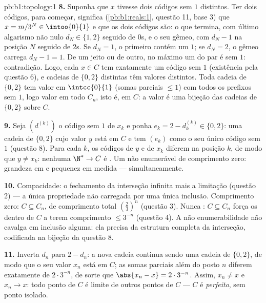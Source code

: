 \begin{solution}{pb:b1:topology:1}
\textbf{8.} Suponha que $x$ tivesse dois códigos sem $1$ distintos. Ter
dois códigos, para começar, significa (\cref{pb:b1:reals:1}, questão 11, base
$3$) que $x = m/3^N \in \intoo{0}{1}$ e que os dois códigos são:
o que termina, com último algarismo não nulo $d_N \in \{1, 2\}$
seguido de $0$s, e o seu gêmeo, com $d_N - 1$ na posição $N$
seguido de $2$s. Se $d_N = 1$, o primeiro contém um $1$; se $d_N
= 2$, o gêmeo carrega $d_N - 1 = 1$. De um jeito ou de outro, no máximo um
do par é sem $1$: contradição. Logo, cada $x \in C$ tem
exatamente um código sem $1$ (existência pela questão 6), e
cadeias de $\{0,2\}$ distintas têm valores distintos. Toda
cadeia de $\{0,2\}$ tem valor em $\intcc{0}{1}$ (somas parciais $\leq
1$) com todos os prefixos sem $1$, logo valor em todo $C_n$,
isto é, em $C$: a  valor é uma bijeção das
cadeias de $\{0,2\}$ sobre $C$.

\textbf{9.} Seja $(d^{(k)})$ o código sem $1$ de $x_k$ e
ponha $e_k = 2 - d^{(k)}_k \in \{0, 2\}$: uma cadeia de $\{0,2\}$ cujo
valor $y$ está em $C$ e tem $(e_k)$ como o seu único código
sem $1$ (questão 8). Para cada $k$, os códigos de $y$ e de $x_k$
diferem na posição $k$, de modo que $y \neq x_k$: nenhuma  $\N^* \to C$ é
. Um  não enumerável de comprimento zero: grandeza
em  e pequenez em medida --- simultaneamente.

\textbf{10.} Compacidade: o fechamento da interseção infinita
mais a limitação (questão 2) --- a única propriedade
não carregada por uma única inclusão. Comprimento zero: $C \subseteq
C_n$, de comprimento total $(\frac23)^n$ (questão 3). Nunca
: $C \subseteq C_n$ força os  dentro de $C$ a terem
comprimento $\leq 3^{-n}$ (questão 4). A não enumerabilidade não
cavalga em inclusão alguma: ela precisa da estrutura completa da
interseção, codificada na bijeção da questão 8.

\textbf{11.} Inverta $d_n$ para $2 - d_n$: a nova cadeia continua sendo
uma cadeia de $\{0,2\}$, de modo que o seu valor $x_n$ está em $C$; as
somas parciais além do posto $n$ diferem exatamente de $2\cdot3^{-n}$, de
sorte que $\abs{x_n - x} = 2\cdot3^{-n}$. Assim, $x_n \neq x$ e $x_n \to
x$: todo ponto de $C$ é limite de outros pontos de $C$ --- $C$
é \emph{perfeito}, sem ponto isolado.


\end{solution}

